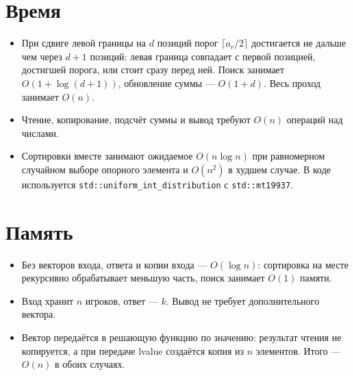 \documentclass[11pt,a4paper]{article}
\begin{document}
\section*{Время}
\begin{itemize}
  \setlength{\itemsep}{0pt}
  \item При сдвиге левой границы на $d$ позиций порог $\lceil a_r/2\rceil$ достигается не дальше чем через $d+1$ позиций:
    левая граница совпадает с первой позицией, достигшей порога, или стоит сразу перед ней.
    Поиск занимает $O(1+\log(d+1))$, обновление суммы --- $O(1+d)$.
    Весь проход занимает $O(n)$.
  \item Чтение, копирование, подсчёт суммы и вывод требуют $O(n)$ операций над числами.
  \item Сортировки вместе занимают ожидаемое $O(n\log n)$ при равномерном случайном выборе опорного элемента
    и $O(n^2)$ в худшем случае.\newline
    В коде используется \texttt{std::uniform\_int\_distribution} с \texttt{std::mt19937}.
\end{itemize}

\section*{Память}
\begin{itemize}
  \setlength{\itemsep}{0pt}
  \item Без векторов входа, ответа и копии входа --- $O(\log n)$: сортировка на месте рекурсивно
    обрабатывает меньшую часть, поиск занимает $O(1)$ памяти.
  \item Вход хранит $n$ игроков, ответ --- $k$. Вывод не требует дополнительного вектора.
  \item Вектор передаётся в решающую функцию по значению: результат чтения не копируется,
    а при передаче lvalue создаётся копия из $n$ элементов. Итого --- $O(n)$ в обоих случаях.
\end{itemize}
\end{document}
